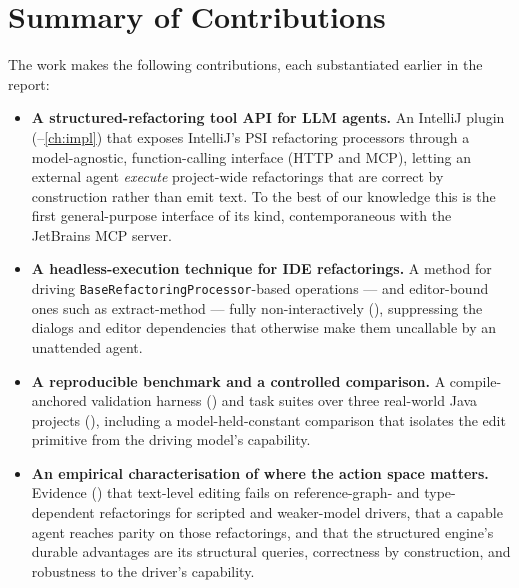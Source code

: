 \section{Summary of Contributions}
\label{sec:concl-contributions}
The work makes the following contributions, each substantiated earlier in the
report:
\begin{itemize}
  \item \textbf{A structured-refactoring tool API for LLM agents.} An IntelliJ plugin
    (--\ref{ch:impl}) that exposes IntelliJ's PSI refactoring processors
    through a model-agnostic, function-calling interface (HTTP and MCP), letting an
    external agent \emph{execute} project-wide refactorings that are correct by
    construction rather than emit text. To the best of our knowledge this is the first
    general-purpose interface of its kind, contemporaneous with the JetBrains MCP server.
  \item \textbf{A headless-execution technique for IDE refactorings.} A method for
    driving \texttt{BaseRefactoringProcessor}-based operations --- and editor-bound ones
    such as extract-method --- fully non-interactively (), suppressing the
    dialogs and editor dependencies that otherwise make them uncallable by an unattended
    agent.
  \item \textbf{A reproducible benchmark and a controlled comparison.} A compile-anchored
    validation harness () and task suites over three real-world
    Java projects (), including a model-held-constant comparison that
    isolates the edit primitive from the driving model's capability.
  \item \textbf{An empirical characterisation of where the action space matters.}
    Evidence () that text-level editing
    fails on reference-graph- and type-dependent refactorings for scripted and
    weaker-model drivers, that a capable agent reaches parity on those refactorings, and
    that the structured engine's durable advantages are its structural queries,
    correctness by construction, and robustness to the driver's capability.
\end{itemize}

